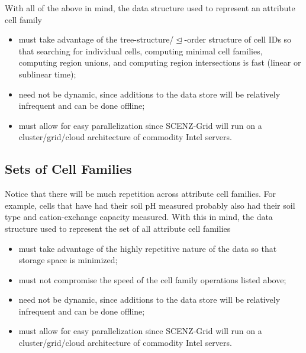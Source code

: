 \documentclass[12pt,a4paper]{amsart}
\numberwithin{figure}{section}
\newcommand{\cle}{\trianglelefteq}
\begin{document}
With all of the above in mind, the data structure used to represent an attribute cell family
\begin{itemize}
    \item must take advantage of the tree-structure/$\cle$-order structure of cell IDs so that searching for individual cells, computing minimal cell families, computing region unions, and computing region intersections is fast (linear or sublinear time);
    \item need not be dynamic, since additions to the data store will be relatively infrequent and can be done offline;
    \item must allow for easy parallelization since SCENZ-Grid will run on a cluster/grid/cloud architecture of commodity Intel servers.
\end{itemize}

\subsection{Sets of Cell Families}

Notice that there will be much repetition across attribute cell families.
For example, cells that have had their soil pH measured probably also had their soil type and cation-exchange capacity measured.  
With this in mind, the data structure used to represent the set of all attribute cell families
\begin{itemize}
    \item must take advantage of the highly repetitive nature of the data so that storage space is minimized; 
    \item must not compromise the speed of the cell family operations listed above;
    \item need not be dynamic, since additions to the data store will be relatively infrequent and can be done offline; 
    \item must allow for easy parallelization since SCENZ-Grid will run on a cluster/grid/cloud architecture of commodity Intel servers.
\end{itemize}



\end{document}
